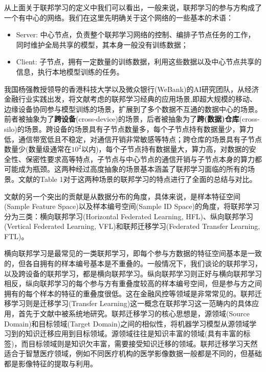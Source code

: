 从上面关于联邦学习的定义中我们可以看出，一般来说，联邦学习的参与方构成了一个有中心的网络。我们在这里先明确关于这个网络的一些基本的术语：
\begin{itemize}
    \item Server: 中心节点，负责整个联邦学习网络的控制、编排子节点任务的工作，同时维护全局共享的模型，其本身一般没有训练数据；
    \item Client: 子节点，拥有一定数量的训练数据，利用这些数据以及中心节点共享的信息，执行本地模型训练的任务。
\end{itemize}

我国杨强教授领导的香港科技大学以及微众银行(WeBank)的AI研究团队，从经济金融行业实践出发，将文献\parencite{mcmahan2017fed_avg}考虑的联邦学习经典的应用场景,即超大规模的移动、边缘设备协同参与模型训练的场景，扩展到了多个数据不互通的数据中心的场景\cite{Yang_2019_VFL}。前者被抽象为了\textbf{跨设备}(cross-device)的场景，后者被抽象为了\textbf{跨(数据)仓库}(cross-silo)的场景\cite{kairouz2019advances_fl}。跨设备的场景具有子节点数量多，每个子节点持有数据量少，算力低，通信带宽低且不稳定，对通信开销非常敏感等特点；跨仓库的场景具有子节点数量少(数量级通常在$10^2$以内)，每个子节点持有数据量大，算力高，对数据的安全性、保密性要求高等特点，子节点与中心节点的通信开销与子节点本身的算力都可能成为瓶颈。这两种经过高度抽象的场景基本涵盖了联邦学习面临的所有的场景。文献\parencite{kairouz2019advances_fl}的Table 1对于这两种场景的联邦学习的特点进行了全面的总结与对比。

文献\parencite{Yang_2019_VFL}的另一个突出的贡献是从数据分布的角度，具体来说，是样本特征空间(Sample Feature Space)以及样本编号空间(Sample ID Space)的角度，将联邦学习分为三类：横向联邦学习(Horizontal Federated Learning, HFL)、纵向联邦学习(Vertical Federated Learning, VFL)和联邦迁移学习(Federated Transfer Learning, FTL)。

横向联邦学习是最常见的一类联邦学习，即每个参与方数据的特征空间基本是一致的，但各自拥有的样本编号基本是不重叠的。一般情况下，我们谈论的联邦学习，以及跨设备的联邦学习，都是横向联邦学习。纵向联邦学习则正好与横向联邦学习相反，纵向联邦学习的每个参与方有重叠度较高的样本编号空间，但是参与方之间拥有的每个样本的特征的重叠度很低。这在金融风控等领域是非常常见的。联邦迁移学习则是迁移学习(Transfer Learning)这一概念在联邦学习这一范畴内的具体应用，首先于文献\parencite{liu_2020_transfer_fl}中被系统地研究。联邦迁移学习的核心思想是，源领域(Source Domain)和目标领域(Target Domain)之间的相似性，将机器学习模型从源领域学习到的知识迁移应用到目标领域。源领域往往是知识丰富的领域(具有丰富的标签)，而目标领域则是知识欠丰富，需要接受知识迁移的领域。联邦迁移学习天然适合于智慧医疗领域，例如不同医疗机构的医学影像数据一般都是不同的，但基础都是影像特征的提取与利用。

